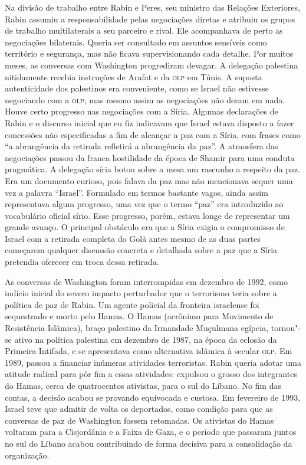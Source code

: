 Na divisão de trabalho entre Rabin e Peres, seu ministro das Relações
Exteriores, Rabin assumiu a responsabilidade pelas negociações diretas e
atribuiu os grupos de trabalho multilaterais a seu parceiro e rival.
Ele acompanhava de perto as negociações bilaterais. Queria ser
consultado em assuntos sensíveis como território e segurança, mas não
ficava supervisionando cada detalhe. Por muitos meses, as conversas com
Washington progrediram devagar. A delegação palestina nitidamente
recebia instruções de Arafat e da \textsc{olp} em Túnis. A suposta autenticidade
dos palestinos era conveniente, como se Israel não estivesse negociando
com a \textsc{olp}, mas mesmo assim as negociações não deram em nada. Houve certo
progresso nas negociações com a Síria. Algumas declarações de Rabin e o
discurso inicial que eu fiz indicavam que Israel estava disposto a fazer
concessões não especificadas a fim de alcançar a paz com a Síria, com
frases como ``a abrangência da retirada refletirá a abrangência da
paz''. A atmosfera das negociações passou da franca hostilidade da época
de Shamir para uma conduta pragmática. A delegação síria botou sobre a
mesa um rascunho a respeito da paz. Era um documento curioso, pois
falava da paz mas não mencionava sequer uma vez a palavra ``Israel''.
Formulado em termos bastante vagos, ainda assim representava algum
progresso, uma vez que o termo ``paz'' era introduzido ao vocabulário
oficial sírio. Esse progresso, porém, estava longe de representar um
grande avanço. O principal obstáculo era que a Síria exigia o
compromisso de Israel com a retirada completa do Golã antes mesmo de as
duas partes começarem qualquer discussão concreta e detalhada sobre a
paz que a Síria pretendia oferecer em troca dessa retirada.

As conversas de Washington foram interrompidas em dezembro de 1992, como
indício inicial do severo impacto perturbador que o terrorismo teria
sobre a política de paz de Rabin. Um agente policial da fronteira
israelense foi sequestrado e morto pelo Hamas. O Hamas (acrônimo para
Movimento de Resistência Islâmica), braço palestino da Irmandade
Muçulmana egípcia, tornou"-se ativo na política palestina em dezembro de
1987, na época da eclosão da Primeira Intifada, e se apresentava como
alternativa islâmica à secular \textsc{olp}. Em 1989, passou a financiar inúmeras
atividades terroristas. Rabin queria adotar uma atitude radical para pôr
fim a essas atividades: expulsou o grosso dos integrantes do Hamas,
cerca de quatrocentos ativistas, para o sul do Líbano. No fim das
contas, a decisão acabou se provando equivocada e custosa. Em fevereiro
de 1993, Israel teve que admitir de volta os deportados, como condição
para que as conversas de paz de Washington fossem retomadas. Os
ativistas do Hamas voltaram para a Cisjordânia e a Faixa de Gaza, e o
período que passaram juntos no sul do Líbano acabou contribuindo de
forma decisiva para a consolidação da organização.

